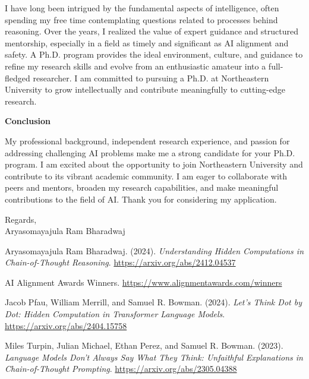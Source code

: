 \documentclass[12pt]{article}
\begin{document}
I have long been intrigued by the fundamental aspects of intelligence, often spending my free time contemplating questions related to  processes behind reasoning. Over the years, I realized the value of expert guidance and structured mentorship, especially in a field as timely and significant as AI alignment and safety. A Ph.D. program provides the ideal environment, culture, and guidance to refine my research skills and evolve from an enthusiastic amateur into a full-fledged researcher. I am committed to pursuing a Ph.D. at Northeastern University to grow intellectually and contribute meaningfully to cutting-edge research.

\textbf{Conclusion}

My professional background, independent research experience, and passion for addressing challenging AI problems make me a strong candidate for your Ph.D. program. I am excited about the opportunity to join
Northeastern University and contribute to its vibrant academic community. I am eager to collaborate with peers and mentors, broaden my research capabilities, and make meaningful contributions to the field of AI. Thank you for considering my application.

Regards,\\
Aryasomayajula Ram Bharadwaj

\newpage
\begin{thebibliography}{9}

Aryasomayajula Ram Bharadwaj. (2024). \emph{Understanding Hidden Computations in Chain-of-Thought Reasoning}.  
\url{https://arxiv.org/abs/2412.04537}

AI Alignment Awards Winners.  
\url{https://www.alignmentawards.com/winners}

Jacob Pfau, William Merrill, and Samuel R. Bowman. (2024). \emph{Let's Think Dot by Dot: Hidden Computation in Transformer Language Models}.  
\url{https://arxiv.org/abs/2404.15758}

Miles Turpin, Julian Michael, Ethan Perez, and Samuel R. Bowman. (2023). \emph{Language Models Don't Always Say What They Think: Unfaithful Explanations in Chain-of-Thought Prompting}.  
\url{https://arxiv.org/abs/2305.04388}

\end{thebibliography}
\end{document}
